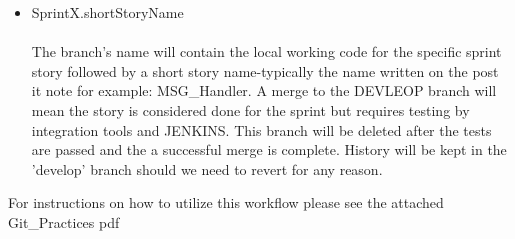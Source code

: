 \begin{itemize}
\item SprintX.shortStoryName\\ \\
The branch's name will contain the local working code for the specific sprint story followed by a short story name-typically the name written on the post it note for example: MSG\_Handler. A merge to the DEVLEOP branch will mean the story is considered done for the sprint but requires testing by integration tools and JENKINS. This branch will be deleted after the tests are passed and the a successful merge is complete. History will be kept in the 'develop' branch should we need to revert for any reason. 
\end{itemize}

For instructions on how to utilize this workflow please see the attached Git\_Practices pdf